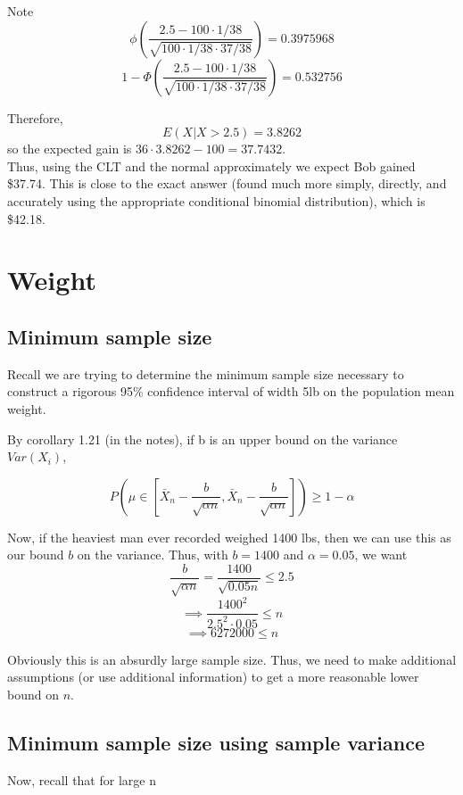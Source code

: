 \documentclass[paper=a4, fontsize=11pt]{scrartcl} %
\numberwithin{equation}{section} %
\numberwithin{figure}{section} %
\numberwithin{table}{section} %
\begin{document}
Note
\[\phi\left(\frac{2.5 - 100\cdot1/38}{\sqrt{100\cdot1/38\cdot37/38}}\right) = 0.3975968\]
\[1-\Phi\left(\frac{2.5 - 100\cdot1/38}{\sqrt{100\cdot1/38\cdot37/38}}\right) = 0.532756\]

Therefore, 
\[E(X | X>2.5) = 3.8262\]
so the expected gain is $36 \cdot 3.8262 - 100 =  37.7432$.\\

Thus, using the CLT and the normal approximately we expect Bob gained \$37.74. This is close to the exact answer (found much more simply, directly, and accurately using the appropriate conditional binomial distribution), which is \$42.18.


\section{Weight}

\subsection{Minimum sample size}

Recall we are trying to determine the minimum sample size necessary to construct a rigorous 95\% confidence interval of width 5lb on the population mean weight.

By corollary 1.21 (in the notes), if b is an upper bound on the variance $Var(X_i)$,

\[P\left(\mu \in \left[\bar{X}_n - \frac{b}{\sqrt{\alpha n}}, \bar{X}_n - \frac{b}{\sqrt{\alpha n}}\right]\right) \geq 1 - \alpha\]

Now, if the heaviest man ever recorded weighed 1400 lbs, then we can use this as our bound $b$ on the variance. Thus, with $b = 1400$ and $\alpha = 0.05$, we want
\[\frac{b}{\sqrt{\alpha n}} = \frac{1400}{\sqrt{0.05 n}} \leq 2.5\]
\[\implies \frac{1400^2}{2.5^2 \cdot 0.05} \leq n\]
\[\implies 6272000 \leq n\]

Obviously this is an absurdly large sample size. Thus, we need to make additional assumptions (or use additional information) to get a more reasonable lower bound on $n$.

\subsection{Minimum sample size using sample variance}
Now, recall that for large n
\end{document}
